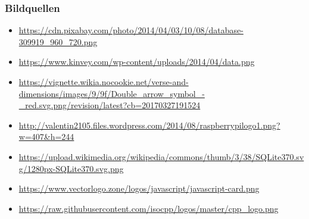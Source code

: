 \begin{frame}
\frametitle{Bildquellen}
    \begin{tiny}
        \begin{itemize}
            \item \url{https://cdn.pixabay.com/photo/2014/04/03/10/08/database-309919_960_720.png}
            \item \url{https://www.kinvey.com/wp-content/uploads/2014/04/data.png}
            \item \url{https://vignette.wikia.nocookie.net/verse-and-dimensions/images/9/9f/Double_arrow_symbol_-_red.svg.png/revision/latest?cb=20170327191524}
            \item \url{http://valentin2105.files.wordpress.com/2014/08/raspberrypilogo1.png?w=407&h=244}
            \item \url{https://upload.wikimedia.org/wikipedia/commons/thumb/3/38/SQLite370.svg/1280px-SQLite370.svg.png}
            \item \url{https://www.vectorlogo.zone/logos/javascript/javascript-card.png}
            \item \url{https://raw.githubusercontent.com/isocpp/logos/master/cpp_logo.png}
        \end{itemize}
    \end{tiny}
\end{frame}